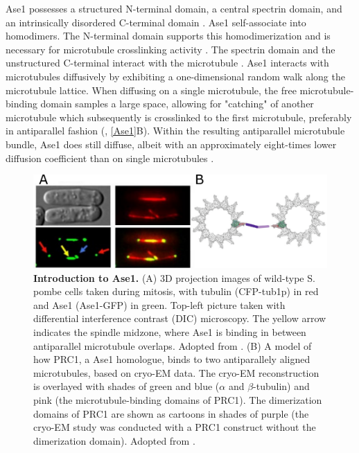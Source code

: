 Ase1 possesses a structured N-terminal domain, a central spectrin domain, and an intrinsically disordered C-terminal domain \parencite{Kapitein2008,Kellogg2018}. Ase1 self-associate into homodimers. The N-terminal domain supports this homodimerization and is necessary for microtubule crosslinking activity \parencite{Janson2007}. The spectrin domain and the unstructured C-terminal interact with the microtubule \parencite{Kellogg2018}. Ase1 interacts with microtubules diffusively by exhibiting a one-dimensional random walk along the microtubule lattice. When diffusing on a single microtubule, the free microtubule-binding domain samples a large space, allowing for "catching" of another microtubule which subsequently is crosslinked to the first microtubule, preferably in antiparallel fashion (\cite{Janson2007}, \autoref{Ase1}B). Within the resulting antiparallel microtubule bundle, Ase1 does still diffuse, albeit with an approximately eight-times lower diffusion coefficient than on single microtubules \parencite{lanskydiffusible2015}.
\begin{figure}[h!tb]
\centering
\includegraphics[scale=1.1]{Figures/Ase1.png}
\caption[Introduction to Ase1.]{
\textbf{Introduction to Ase1.} (A) 3D projection images of wild-type S. pombe cells taken during mitosis, with tubulin (CFP-tub1p) in red and Ase1 (Ase1-GFP) in green. Top-left picture taken with differential interference contrast (DIC) microscopy. The yellow arrow indicates the spindle midzone, where Ase1 is binding in between antiparallel microtubule overlaps. Adopted from \cite{Loiodice2005}. (B) A model of how PRC1, a Ase1 homologue, binds to two antiparallely aligned microtubules, based on cryo-EM data. The cryo-EM reconstruction is overlayed with shades of green and blue ($\alpha$ and $\beta$-tubulin) and pink (the microtubule-binding domains of PRC1). The dimerization domains of PRC1 are shown as cartoons in shades of purple (the cryo-EM study was conducted with a PRC1 construct without the dimerization domain). Adopted from \cite{Kellogg2016}. 
	}\label{Ase1}
\end{figure}

